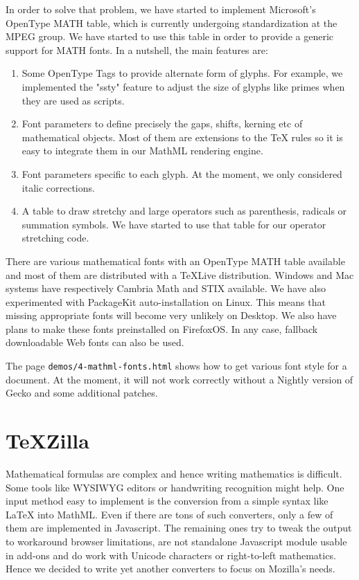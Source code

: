 In order to solve that problem, we have started to implement Microsoft's
OpenType MATH table, which is currently undergoing standardization at the
MPEG group. We have started to use this table in order to provide a generic
support for MATH fonts. In a nutshell, the main features are:

\begin{enumerate}

\item Some OpenType Tags to provide alternate form of glyphs. For example,
  we implemented the "ssty" feature to adjust the size of glyphs like primes
  when they are used as scripts.

\item Font parameters to define precisely the gaps, shifts, kerning etc of
  mathematical objects. Most of them are extensions to the TeX rules so it
  is easy to integrate them in our MathML rendering engine.

\item Font parameters specific to each glyph. At the moment, we only considered
  italic corrections.

\item A table to draw stretchy and large operators such as parenthesis,
  radicals or summation symbols. We have started to use that table for our
  operator stretching code.

\end{enumerate}

There are various mathematical fonts with an OpenType MATH table available and
most of them are distributed with a TeXLive distribution. Windows and Mac
systems have respectively Cambria Math and STIX available. We have also
experimented with PackageKit auto-installation on Linux. This means that
missing appropriate fonts will become very unlikely on Desktop. We also have
plans to make these fonts preinstalled on FirefoxOS. In any case, fallback
downloadable Web fonts can also be used.

The page {\tt demos/4-mathml-fonts.html} shows how to get various font style for
a document. At the moment, it will not work correctly without a Nightly
version of Gecko and some additional patches.

\section{TeXZilla}

Mathematical formulas are complex and hence writing mathematics is difficult.
Some tools like WYSIWYG editors or handwriting recognition might help. One
input method easy to implement is the conversion from a simple syntax like
LaTeX into MathML. Even if there are tons of such converters, only a few of
them are implemented in Javascript. The remaining ones try to tweak the output
to workaround browser limitations, are not standalone Javascript module usable
in add-ons and do work with Unicode characters or right-to-left
mathematics. Hence we decided to write yet another converters to focus on
Mozilla's needs.

